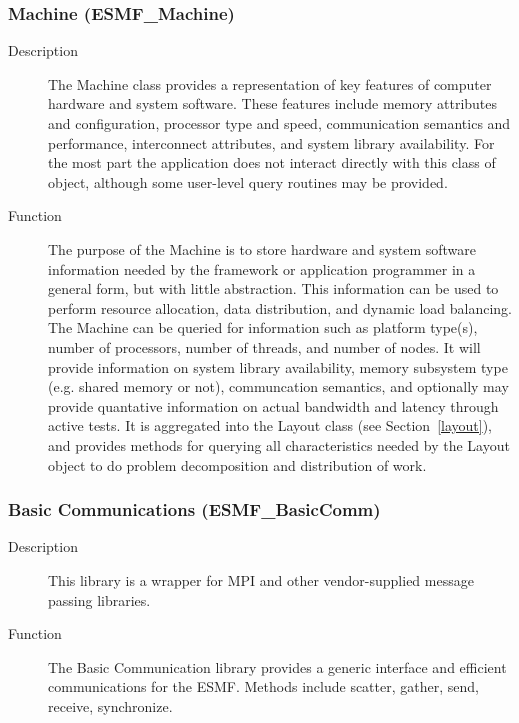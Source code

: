 \subsubsection{Machine (ESMF\_Machine)} 
\label{sec:machine} 
\begin{description}
\item [Description] The Machine class provides a representation of 
key features of computer hardware and system software.  These
features include memory attributes and configuration, processor type and speed,
communication semantics and performance, 
interconnect attributes, and system library availability.
For the most part the application does not
interact directly with this class of object, although some 
user-level query routines may be provided.
\item [Function]
The purpose of the Machine is to store hardware and system software
information needed by the framework or application programmer in a general
form, but with little abstraction.  This information can be used to 
perform resource allocation, data distribution, and dynamic load balancing.  
The Machine can be queried for information such as
platform type(s), number of processors, number of threads, and number of 
nodes.  It will provide information on system library availability,
memory subsystem type (e.g. shared memory or not), 
communcation semantics, and optionally
may provide quantative information on actual bandwidth and 
latency through active tests.  
It is aggregated into the Layout class (see Section~\ref{layout}), and provides
methods for querying all characteristics needed by the Layout object to do 
problem decomposition and distribution of work.
\end{description}

\subsubsection{Basic Communications (ESMF\_BasicComm)}
\label{sec:basiccomm} 
\begin{description}
\item [Description] This library is a wrapper for MPI and other vendor-supplied 
message passing libraries.
\item [Function] The Basic Communication library provides a generic interface
and efficient communications for the ESMF.  Methods include scatter, gather, send,
receive, synchronize. 
\end{description}

